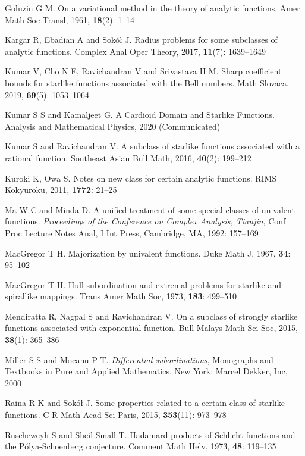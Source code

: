 \documentclass[12pt, reqno]{amsart}
\numberwithin{equation}{section}
\theoremstyle{plain}
\theoremstyle{definition}
\theoremstyle{remark}
\begin{document}
\begin{thebibliography}{99}
  Goluzin G M. On a variational method in the theory of analytic functions. Amer Math Soc Transl, 1961, {\bf 18}(2): 1--14

 Kargar R, Ebadian A and {Sok\'{o}\l} J. Radius problems for some subclasses of analytic functions. Complex Anal Oper Theory, 2017, {\bf11}(7): 1639--1649

 Kumar V, Cho N E, Ravichandran V and Srivastava H M. Sharp coefficient bounds for starlike functions associated with the Bell numbers. Math Slovaca, 2019, {\bf69}(5): 1053--1064

  Kumar S S and Kamaljeet G. A Cardioid Domain and Starlike Functions. Analysis and Mathematical Physics, 2020 (Communicated)

 Kumar S and Ravichandran V. A subclass of starlike functions associated with a rational function. Southeast Asian Bull Math, 2016, {\bf 40}(2): 199--212	

 Kuroki K, Owa S. Notes on new class for certain analytic functions. RIMS Kokyuroku, 2011, {\bf1772}: 21--25

  Ma W C and Minda D. A unified treatment of some special classes of univalent functions. {\it Proceedings of the Conference on Complex Analysis, Tianjin}, Conf Proc Lecture Notes Anal, I Int Press, Cambridge, MA, 1992:  157--169

  MacGregor T H. Majorization by univalent functions. Duke Math J, 1967, {\bf 34}: 95--102

  MacGregor T H. Hull subordination and extremal problems for starlike and spirallike mappings. Trans Amer Math Soc, 1973, {\bf 183}: 499--510

  Mendiratta R, Nagpal S and Ravichandran V. On a subclass of strongly starlike functions associated with exponential function. Bull Malays Math Sci Soc, 2015, {\bf 38}(1): 365--386

  Miller S S and Mocanu P T. {\it Differential subordinations}, Monographs and Textbooks in Pure and Applied Mathematics. New York: Marcel Dekker, Inc, 2000

 Raina R K and {Sok\'{o}\l} J. Some properties related to a certain class of starlike functions. C R Math Acad Sci Paris, 2015, {\bf 353}(11): 973--978

 Ruscheweyh S and Sheil-Small T. Hadamard products of Schlicht functions and the P\'{o}lya-Schoenberg conjecture. Comment Math Helv, 1973, {\bf 48}: 119--135


\end{thebibliography}
\end{document}
